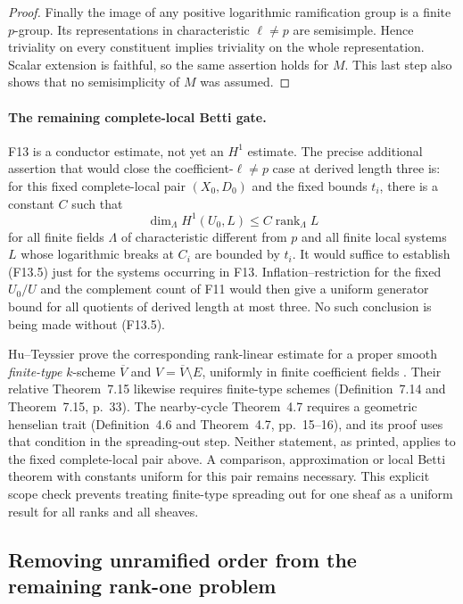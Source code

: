\begin{proof}
Finally the image of any positive logarithmic ramification group
is a finite $p$-group. Its representations in characteristic
$\ell\ne p$ are semisimple. Hence triviality on every constituent
implies triviality on the whole representation. Scalar extension
is faithful, so the same assertion holds for $M$. This last step
also shows that no semisimplicity of $M$ was assumed.
\end{proof}

\paragraph{The remaining complete-local Betti gate.}
F13 is a conductor estimate, not yet an $H^1$ estimate. The precise
additional assertion that would close the coefficient-$\ell\ne p$
case at derived length three is: for this fixed complete-local
pair $(X_0,D_0)$ and the fixed bounds $t_i$, there is a constant
$C$ such that
\[
 \dim_\Lambda H^1(U_0,L)\leq C\operatorname{rank}_\Lambda L
 \tag{F13.5}
\]
for all finite fields $\Lambda$ of characteristic different from
$p$ and all finite local systems $L$ whose logarithmic breaks
at $C_i$ are bounded by $t_i$. It would suffice to establish
(F13.5) just for the systems occurring in F13.
Inflation--restriction for the fixed $U_0/U$ and the complement
count of F11 would then give a uniform generator bound for all
quotients of derived length at most three. No such conclusion is
being made without (F13.5).

Hu--Teyssier prove the corresponding rank-linear estimate for a
proper smooth \emph{finite-type} $k$-scheme $\overline V$ and
$V=\overline V\setminus E$, uniformly in finite coefficient fields
\cite[Theorem~7.34, p.~41]{HuTeyssier2025Betti}. Their relative
Theorem~7.15 likewise requires finite-type schemes
(Definition~7.14 and Theorem~7.15, p.~33). The nearby-cycle
Theorem~4.7 requires a geometric henselian trait
(Definition~4.6 and Theorem~4.7, pp.~15--16), and its proof uses
that condition in the spreading-out step. Neither statement,
as printed, applies to the fixed complete-local pair above.
A comparison, approximation or local Betti theorem with constants
uniform for this pair remains necessary. This explicit scope
check prevents treating finite-type spreading out for one sheaf
as a uniform result for all ranks and all sheaves.


\subsection{Removing unramified order from the remaining rank-one problem}

